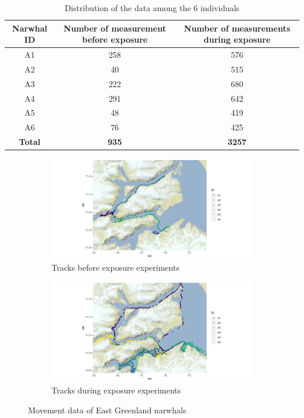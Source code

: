 \documentclass[11pt]{article}
\newcommand {\1}{\mathbb{1}}
\begin{document}
\begin{table}[H]
	\centering
	\begin{tabular}{|c|c|c|}
		\hline
		Narwhal ID & Number of measurement before exposure & Number of measurements during exposure \\
		\hline
		A1 & 258 & 576\\
		\hline
		A2  & 40 & 515 \\
		\hline
		A3 & 222 & 680 \\
		\hline
		A4 & 291 & 642  \\
		\hline
		A5 & 48 & 419\\
		\hline
		A6 & 76 & 425 \\
		\hline
		\textbf{Total} & \textbf{935} & \textbf{3257} \\
		\hline
	\end{tabular}
	\caption{Distribution of the data among the 6 individuals}
	\label{table: data distribution}
\end{table}

\begin{figure}[H]
    \centering
\begin{subfigure}{0.49\textwidth}
    \centering
    \includegraphics[scale=0.38]{images/data_exploration/all_tracksBE.png}
    \caption{Tracks before exposure experiments}
\end{subfigure}
\begin{subfigure}{0.49\textwidth}
    \centering
    \includegraphics[scale=0.38]{images/data_exploration/all_tracksAE.png}
    \caption{Tracks during exposure experiments}
\end{subfigure}
\caption{Movement data of East Greenland narwhals}
\label{fig: tracks before and after exposure}
\end{figure}
\end{document}
